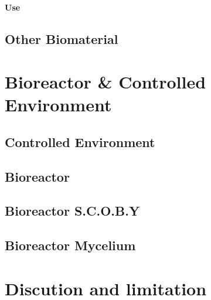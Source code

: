 \paragraph[short]{Use}










\subsection{Other Biomaterial}




















\section{Bioreactor \& Controlled Environment }

\subsection{Controlled Environment} 



















\subsection{Bioreactor}
\subsection{Bioreactor S.C.O.B.Y}
\subsection{Bioreactor Mycelium}



\section{Discution and limitation}